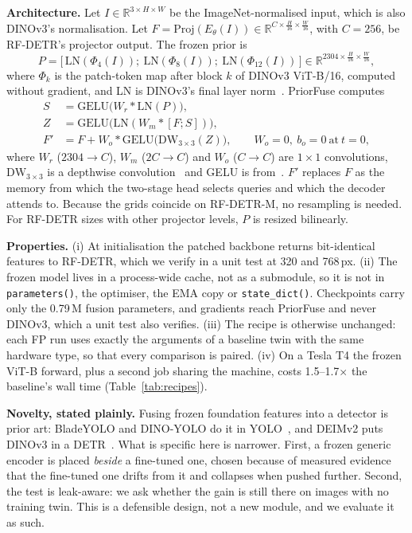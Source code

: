 \textbf{Architecture.} Let $I\in\mathbb{R}^{3\times H\times W}$ be the ImageNet-normalised input, which is also DINOv3's normalisation. Let $F=\mathrm{Proj}(E_\theta(I))\in\mathbb{R}^{C\times\frac{H}{16}\times\frac{W}{16}}$, with $C=256$, be RF-DETR's projector output. The frozen prior is
\begin{equation}
P=\big[\,\mathrm{LN}(\Phi_4(I));\ \mathrm{LN}(\Phi_8(I));\ \mathrm{LN}(\Phi_{12}(I))\,\big]\in\mathbb{R}^{2304\times\frac{H}{16}\times\frac{W}{16}},
\label{eq:prior}
\end{equation}
where $\Phi_k$ is the patch-token map after block $k$ of DINOv3 ViT-B/16, computed without gradient, and LN is DINOv3's final layer norm~\cite{layernorm}. PriorFuse computes
\begin{align}
S &= \mathrm{GELU}\big(W_r\ast\mathrm{LN}(P)\big), \label{eq:reduce}\\
Z &= \mathrm{GELU}\big(\mathrm{LN}(W_m\ast[F;S])\big), \label{eq:mix}\\
F' &= F + W_o\ast\mathrm{GELU}\big(\mathrm{DW}_{3\times3}(Z)\big),\qquad W_o=0,\ b_o=0\ \text{at}\ t=0, \label{eq:fuse}
\end{align}
where $W_r$ ($2304\rightarrow C$), $W_m$ ($2C\rightarrow C$) and $W_o$ ($C\rightarrow C$) are $1\times1$ convolutions, $\mathrm{DW}_{3\times3}$ is a depthwise convolution~\cite{xception} and GELU is from~\cite{gelu}. $F'$ replaces $F$ as the memory from which the two-stage head selects queries and which the decoder attends to. Because the grids coincide on RF-DETR-M, no resampling is needed. For RF-DETR sizes with other projector levels, $P$ is resized bilinearly.

\textbf{Properties.} (i) At initialisation the patched backbone returns bit-identical features to RF-DETR, which we verify in a unit test at 320 and 768\,px. (ii) The frozen model lives in a process-wide cache, not as a submodule, so it is not in \texttt{parameters()}, the optimiser, the EMA copy or \texttt{state\_dict()}. Checkpoints carry only the 0.79\,M fusion parameters, and gradients reach PriorFuse and never DINOv3, which a unit test also verifies. (iii) The recipe is otherwise unchanged: each FP run uses exactly the arguments of a baseline twin with the same hardware type, so that every comparison is paired. (iv) On a Tesla T4 the frozen ViT-B forward, plus a second job sharing the machine, costs 1.5--1.7$\times$ the baseline's wall time (Table~\ref{tab:recipes}).

\textbf{Novelty, stated plainly.} Fusing frozen foundation features into a detector is prior art: BladeYOLO and DINO-YOLO do it in YOLO~\cite{bladeyolo,dinoyolo}, and DEIMv2 puts DINOv3 in a DETR~\cite{deimv2}. What is specific here is narrower. First, a frozen generic encoder is placed \emph{beside} a fine-tuned one, chosen because of measured evidence that the fine-tuned one drifts from it and collapses when pushed further. Second, the test is leak-aware: we ask whether the gain is still there on images with no training twin. This is a defensible design, not a new module, and we evaluate it as such.


